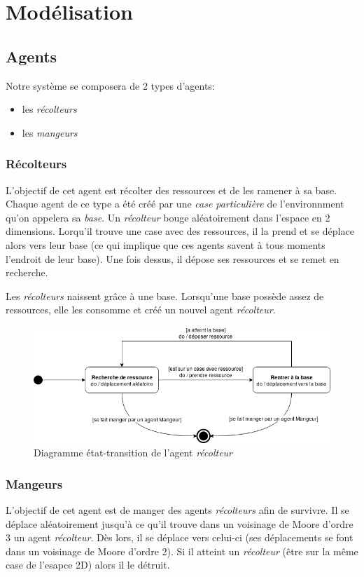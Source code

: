 \documentclass{article}
\begin{document}
\section{Modélisation}
\subsection{Agents}
Notre système se composera de 2 types d'agents:
\begin{itemize}
  \item les \emph{récolteurs}
  \item les \emph{mangeurs}
\end{itemize}

\subsubsection{Récolteurs}
L'objectif de cet agent est récolter des ressources et de les ramener à sa base. Chaque
agent de ce type a été créé par une \emph{case particulière} de l'environnment qu'on
appelera sa \emph{base}. Un \emph{récolteur} bouge aléatoirement dans l'espace
en 2 dimensions. Lorqu'il trouve une case avec des ressources, il la prend et se déplace
alors vers leur base (ce qui implique que ces agents savent à tous moments l'endroit de
leur base). Une fois dessus, il dépose ses ressources et se remet en recherche.

Les \emph{récolteurs} naissent grâce à une base. Lorsqu'une base possède assez de ressources,
elle les consomme et créé un nouvel agent \emph{récolteur}.

\begin{figure}[!ht]
  \centering
  \caption{Diagramme état-transition de l'agent \emph{récolteur}}
  \includegraphics[scale=0.70]{img/etat-transition_recolteur.png}
\end{figure}

\subsubsection{Mangeurs}
L'objectif de cet agent est de manger des agents \emph{récolteurs} afin de survivre.
Il se déplace aléatoirement jusqu'à ce qu'il trouve dans un voisinage de Moore d'ordre 3
un agent \emph{récolteur}. Dès lors, il se déplace vers celui-ci (ses déplacements se
font dans un voisinage de Moore d'ordre 2). Si il atteint un \emph{récolteur} (être
sur la même case de l'esapce 2D) alors il le détruit.
\end{document}
